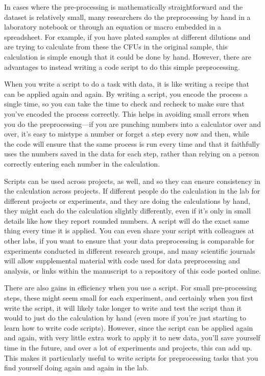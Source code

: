 \documentclass[]{tufte-book}
\begin{document}
In cases where the pre-processing is mathematically straightforward and the
dataset is relatively small, many researchers do the preprocessing by hand in a
laboratory notebook or through an equation or macro embedded in a spreadsheet.
For example, if you have plated samples at different dilutions and are trying to
calculate from these the CFUs in the original sample, this calculation is simple
enough that it could be done by hand. However, there are advantages to instead
writing a code script to do this simple preprocessing.

When you write a script to do a task with data, it is like writing a recipe that
can be applied again and again. By writing a script, you encode the process a
single time, so you can take the time to check and recheck to make sure that
you've encoded the process correctly. This helps in avoiding small errors when
you do the preprocessing---if you are punching numbers into a calculator over
and over, it's easy to mistype a number or forget a step every now and then,
while the code will ensure that the same process is run every time and that it
faithfully uses the numbers saved in the data for each step, rather than relying
on a person correctly entering each number in the calculation.

Scripts can be used across projects, as well, and so they can ensure consistency
in the calculation across projects. If different people do the calculation in
the lab for different projects or experiments, and they are doing the
calculations by hand, they might each do the calculation slightly differently,
even if it's only in small details like how they report rounded numbers. A
script will do the exact same thing every time it is applied. You can even share
your script with colleagues at other labs, if you want to ensure that your data
preprocessing is comparable for experiments conducted in different research
groups, and many scientific journals will allow supplemental material with
code used for data preprocessing and analysis, or links within the manuscript
to a repository of this code posted online.

There are also gains in efficiency when you use a script. For small
pre-processing steps, these might seem small for each experiment, and certainly
when you first write the script, it will likely take longer to write and test
the script than it would to just do the calculation by hand (even more if
you're just starting to learn how to write code scripts). However, since the
script can be applied again and again, with very little extra work to apply it
to new data, you'll save yourself time in the future, and over a lot of
experiments and projects, this can add up. This makes it particularly useful to
write scripts for preprocessing tasks that you find yourself doing again and
again in the lab.
\end{document}
